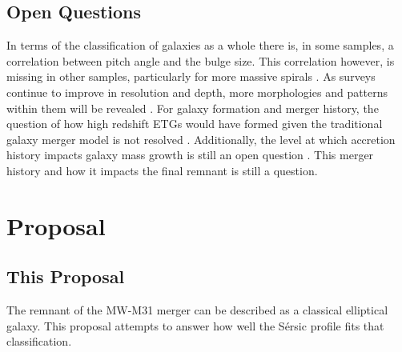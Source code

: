 \documentclass[fleqn,usenatbib]{mnras}
\begin{document}
\subsection{Open Questions}
In terms of the classification of galaxies as a whole there is, in some samples, a correlation between pitch angle and the bulge size. This correlation however, is missing in other samples, particularly for more massive spirals \citep{Masters2025morphology}. As surveys continue to improve in resolution and depth, more morphologies and patterns within them will be revealed \citep{Masters2025morphology}. For galaxy formation and merger history, the question of how high redshift ETGs would have formed given the traditional galaxy merger model is not resolved \citep{Duc2013}. Additionally, the level at which accretion history impacts galaxy mass growth is still an open question \citep{Duc2013}. This merger history and how it impacts the final remnant is still a question.


\section{Proposal}

\subsection{This Proposal}
The remnant of the MW-M31 merger can be described as a classical elliptical galaxy. This proposal attempts to answer how well the S\'ersic profile fits that classification. 
\end{document}
